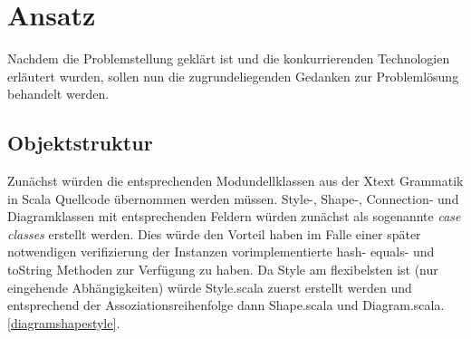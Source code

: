 \chapter{Ansatz}\label{ansatz}
Nachdem die Problemstellung geklärt ist und die konkurrierenden Technologien erläutert wurden, sollen nun die zugrundeliegenden Gedanken zur Problemlösung behandelt werden.
\section{Objektstruktur}
Zunächst würden die entsprechenden Modundellklassen aus der Xtext Grammatik in Scala Quellcode übernommen werden müssen. Style-, Shape-, Connection- und Diagramklassen mit entsprechenden Feldern würden zunächst als sogenannte \textit{case classes} erstellt werden. Dies würde den Vorteil haben im Falle einer später notwendigen verifizierung der Instanzen vorimplementierte hash- equals- und toString Methoden zur Verfügung zu haben. Da Style am flexibelsten ist (nur eingehende Abhängigkeiten) würde Style.scala zuerst erstellt werden und entsprechend der Assoziationsreihenfolge dann Shape.scala und Diagram.scala. \ref{diagramshapestyle}.
